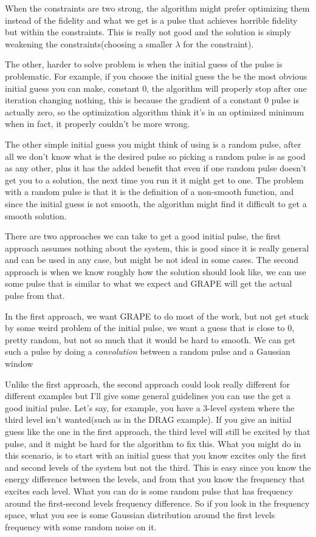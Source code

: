 \documentclass[english, a4paper, 12pt, twoside]{article}
\numberwithin{equation}{section} %
\begin{document}
When the constraints are two strong, the algorithm might prefer optimizing them instead of the fidelity and what we get is a pulse that achieves horrible fidelity but within the constraints. This is really not good and the solution is simply weakening the constraints(choosing a smaller $\lambda$ for the constraint).

The other, harder to solve problem is when the initial guess of the pulse is problematic. For example, if you choose the initial guess the be the most obvious initial guess you can make, constant 0, the algorithm will properly stop after one iteration changing nothing, this is because the gradient of a constant 0 pulse is actually zero, so the optimization algorithm think it's in an optimized minimum when in fact, it properly couldn't be more wrong.

The other simple initial guess you might think of using is a random pulse, after all we don't know what is the desired pulse so picking a random pulse is as good as any other, plus it has the added benefit that even if one random pulse doesn't get you to a solution, the next time you run it it might get to one. The problem with a random pulse is that it is the definition of a non-smooth function, and since the initial guess is not smooth, the algorithm might find it difficult to get a smooth solution.

There are two approaches we can take to get a good initial pulse, the first approach assumes nothing about the system, this is good since it is really general and can be used in any case, but might be not ideal in some cases. The second approach is when we know roughly how the solution should look like, we can use some pulse that is similar to what we expect and GRAPE will get the actual pulse from that.

In the first approach, we want GRAPE to do most of the work, but not get stuck by some weird problem of the initial pulse, we want a guess that is close to 0, pretty random, but not so much that it would be hard to smooth. We can get such a pulse by doing a \textit{convolution} between a random pulse and a Gaussian window %

Unlike the first approach, the second approach could look really different for different examples but I'll give some general guidelines you can use the get a good initial pulse. Let's say, for example, you have a 3-level system where the third level isn't wanted(such as in the DRAG example). If you give an initial guess like the one in the first approach, the third level will still be excited by that pulse, and it might be hard for the algorithm to fix this. What you might do in this scenario, is to start with an initial guess that you know excites only the first and second levels of the system but not the third. This is easy since you  know the energy difference between the levels, and from that you know the frequency that excites each level. What you can do is some random pulse that has frequency around the first-second levels frequency difference. So if you look in the frequency space, what you see is some Gaussian distribution around the first levels frequency with some random noise on it.
\end{document}
